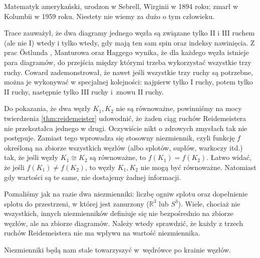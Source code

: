 \begin{remark}
    Matematyk amerykański, urodzon w Sebrell, Wirginii w 1894 roku; zmarł w Kolumbii w 1959 roku.
    Niestety nie wiemy za dużo o tym człowieku.
\end{remark}

Trace \cite{trace1983} zauważył, że dwa diagramy jednego węzła są związane tylko II i III ruchem (ale nie I) wtedy i tylko wtedy, gdy mają ten sam spin oraz indeksy nawinięcia.
%
%
%
Z prac Östlunda \cite{ostlund2001}, Manturowa \cite[s. ???]{manturov2004} oraz Haggego \cite{hagge2006} wynika, że dla każdego węzła istnieje para diagramów, do przejścia między którymi trzeba wykorzystać wszystkie trzy ruchy.
%
%
%
Coward \cite{coward2006} zademonstrował, że nawet jeśli wszystkie trzy ruchy są potrzebne, można je wykonywać w specjalnej kolejności: najpierw tylko I ruchy, potem tylko II ruchy, następnie tylko III ruchy i~znowu II ruchy.
%

Do pokazania, że dwa węzły $K_1, K_2$ nie są równoważne, powinniśmy na mocy twierdzenia \ref{thm:reidemeister} udowodnić, że żaden ciąg ruchów Reidemeistera nie przekształca jednego w drugi.
\label{page_first_invariant}%
Oczywiście nikt o zdrowych zmysłach tak nie postępuje.
Zamiast tego wprowadza się stosowny niezmiennik, czyli funkcję $f$ określoną na zbiorze wszystkich węzłów (albo splotów, supłów, warkoczy itd.) tak, że jeśli węzły $K_1 \cong K_2$ są równoważne, to $f(K_1) = f(K_2)$.
Łatwo widać, że jeśli $f(K_1) \neq f(K_2)$, to węzły $K_1, K_2$ nie mogą być równoważne.
Natomiast gdy wartości są te same, nie dostajemy żadnej informacji.

Poznaliśmy jak na razie dwa niezmienniki: liczbę ogniw splotu oraz dopełnienie splotu do przestrzeni, w której jest zanurzony ($\mathbb R^3$ lub $S^3$).
Wiele, chociaż nie wszystkich, innych niezmienników definiuje się nie bezpośrednio na zbiorze węzłów, ale na zbiorze diagramów.
Należy wtedy sprawdzić, że każdy z trzech ruchów Reidemeistera nie ma wpływu na wartość niezmiennika.

Niezmienniki będą nam stale towarzyszyć w~wędrówce po krainie węzłów.

